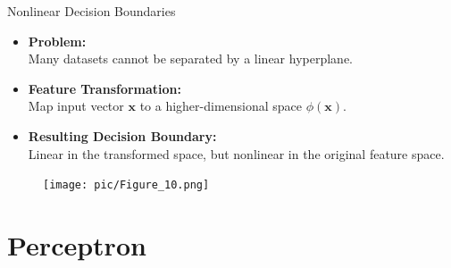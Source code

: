 \documentclass[serif, aspectratio=169]{beamer}
\begin{document}
\begin{frame}{Nonlinear Decision Boundaries}
    \begin{itemize}\itemsep1em
        \item \textbf{Problem:}\\ Many datasets cannot be separated by a linear hyperplane.
        \item \textbf{Feature Transformation:}\\ Map input vector $\mathbf{x}$ to a higher-dimensional space $\phi(\mathbf{x})$.
        \item \textbf{Resulting Decision Boundary:}\\ Linear in the transformed space, but nonlinear in the original feature space.
    \end{itemize}
    \endminipage
    \hfill
        \begin{figure}
            \texttt{[image: pic/Figure\_10.png]}
        \end{figure}
    \endminipage
    \vfill
\end{frame}


\section{Perceptron}
\end{document}
